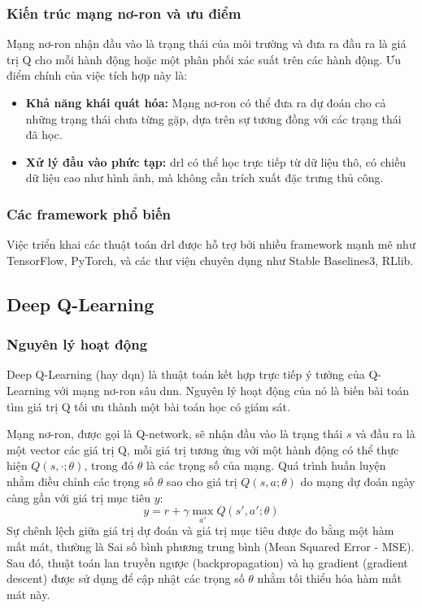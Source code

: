 \subsubsection{Kiến trúc mạng nơ-ron và ưu điểm}
Mạng nơ-ron nhận đầu vào là trạng thái của môi trường và đưa ra đầu ra là giá trị
Q cho mỗi hành động hoặc một phân phối xác suất trên các hành động. Ưu điểm
chính của việc tích hợp này là:
\begin{itemize}
    \item \textbf{Khả năng khái quát hóa:} Mạng nơ-ron có thể đưa ra dự đoán cho
        cả những trạng thái chưa từng gặp, dựa trên sự tương đồng với các trạng thái
        đã học.

    \item \textbf{Xử lý đầu vào phức tạp:} \ac{drl} có thể học trực tiếp từ dữ liệu
        thô, có chiều dữ liệu cao như hình ảnh, mà không cần trích xuất đặc trưng
        thủ công.
\end{itemize}

\subsubsection{Các framework phổ biến}
Việc triển khai các thuật toán \ac{drl} được hỗ trợ bởi nhiều framework mạnh mẽ như
TensorFlow, PyTorch, và các thư viện chuyên dụng như Stable Baselines3, RLlib.

\subsection{Deep Q-Learning}
\subsubsection{Nguyên lý hoạt động}
Deep Q-Learning (hay \ac{dqn}) là thuật toán kết hợp trực tiếp ý tưởng của Q-Learning
với mạng nơ-ron sâu \ac{dnn}. Nguyên lý hoạt động của nó là biến bài toán tìm giá
trị Q tối ưu thành một bài toán học có giám sát.

Mạng nơ-ron, được gọi là Q-network, sẽ nhận đầu vào là trạng thái $s$ và đầu ra là
một vector các giá trị Q, mỗi giá trị tương ứng với một hành động có thể thực
hiện $Q(s, \cdot; \theta)$, trong đó $\theta$ là các trọng số của mạng. Quá
trình huấn luyện nhằm điều chỉnh các trọng số $\theta$ sao cho giá trị
$Q(s, a; \theta)$ do mạng dự đoán ngày càng gần với giá trị mục tiêu $y$:
\begin{equation}
    y = r + \gamma \max_{a'}Q(s', a'; \theta)
    \label{eq:q_value}
\end{equation}
Sự chênh lệch giữa giá trị dự đoán và giá trị mục tiêu được đo bằng một hàm mất mát,
thường là Sai số bình phương trung bình (Mean Squared Error - MSE). Sau đó,
thuật toán lan truyền ngược (backpropagation) và hạ gradient (gradient descent)
được sử dụng để cập nhật các trọng số $\theta$ nhằm tối thiểu hóa hàm mất mát
này.

